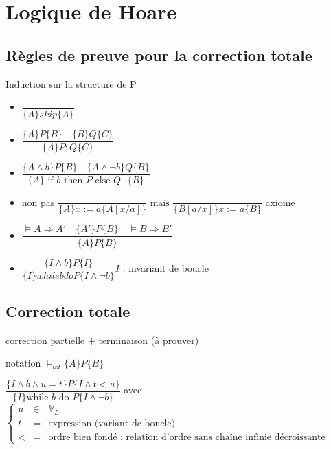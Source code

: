 \documentclass[10pt,a4paper]{article}
\newcommand{\Vs}{\mathbb{V}}
\begin{document}
\section{Logique de Hoare}
\subsection{Règles de preuve pour la correction totale}
Induction sur la structure de P
\begin{itemize}
 \item $\dfrac{}{\{A\}skip\{A\}}$\\
 \item $\dfrac{\{A\}P\{B\} \quad \{B\}Q\{C\}}{\{A\}P;Q\{C\}}$\\
 \item $\dfrac{\{A \wedge b\}P\{B\} \quad \{A \wedge \lnot b\}Q\{B\}}{\{A\}\text{ if $b$ then $P$ else $Q$ }\{B\}}$\\
 \item non pas $ \dfrac{}{\{A\}x := a\{A[x/a]\}}\text{ mais }\dfrac{}{\{B[a/x]\}x := a\{B\}}$ axiome\\
 \item $\dfrac{\models A \Rightarrow A' \quad \{A'\}P\{B\} \quad \models B \Rightarrow B'}{\{A\}P\{B\}}$\\
 \item $\dfrac{\{I \wedge b \}P\{I\}}{\{I\}while b do P\{I \wedge \lnot b\}} I$ : invariant de boucle\\
\end{itemize}

\subsection{Correction totale}
correction partielle + terminaison (à prouver)

notation $\models_{tot} \{A\}P\{B\}$

$\dfrac{ \{I \wedge b \wedge u = t\}P\{I \wedge t<u\}}{\{I\}\text{while $b$ do $P$}\{I \wedge \lnot b\}}$ avec 
$\left\{\begin{array}{lcl}
 u & \in&  \Vs_L\\
t & = & \text{expression (variant de boucle)}\\
< & =& \text{ordre bien fondé : relation d'ordre sans chaîne infinie décroissante}
\end{array}\right.$
\end{document}
